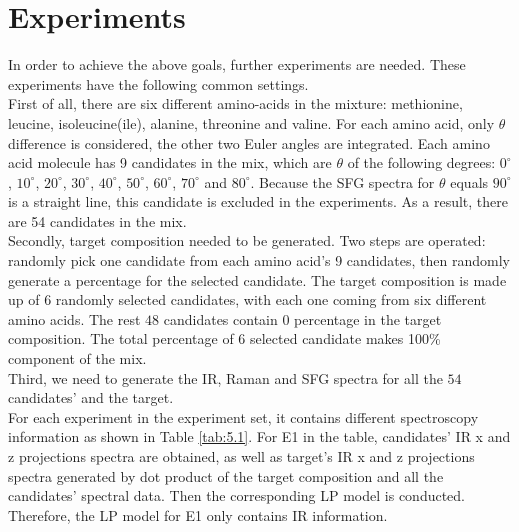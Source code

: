 \section{Experiments}

In order to achieve the above goals, further experiments are needed. These experiments have the following common settings. \\

First of all, there are six different amino-acids in the mixture: methionine, leucine, isoleucine(ile), alanine, threonine and valine. For each amino acid, only $\theta$ difference is considered, the other two Euler angles are integrated. Each amino acid molecule has 9 candidates in the mix, which are $\theta$ of the following degrees: $0^{\circ}$,  $10^{\circ}$, $20^{\circ}$, $30^{\circ}$, $40^{\circ}$, $50^{\circ}$, $60^{\circ}$, $70^{\circ}$ and $80^{\circ}$. Because the SFG spectra for $\theta$ equals $90^{\circ}$ is a straight line, this candidate is excluded in the experiments. As a result, there are 54 candidates in the mix. \\

Secondly, target composition needed to be generated. Two steps are operated: randomly pick one candidate from each amino acid's 9 candidates, then randomly generate a percentage for the selected candidate. The target composition is made up of $6$ randomly selected candidates, with each one coming from six different amino acids. The rest $48$ candidates contain $0$ percentage in the target composition. The total percentage of 6 selected candidate makes 100\% component of the mix. \\

Third, we need to generate the IR, Raman and SFG spectra for all the $54$ candidates' and the target. \\



For each experiment in the experiment set, it contains different spectroscopy information as shown in Table \ref{tab:5.1}. For E1 in the table, candidates' IR x and z projections spectra are obtained, as well as target's IR x and z projections spectra generated by dot product of the target composition and all the candidates' spectral data. Then the corresponding LP model is conducted. Therefore, the LP model for E1 only contains IR information.\\

